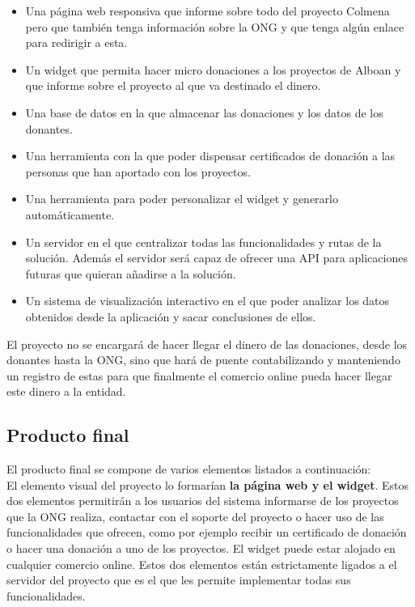 \begin{itemize}
	\item Una página web responsiva que informe sobre todo del proyecto Colmena pero que también tenga información sobre la ONG y que tenga algún enlace para redirigir a esta.
	\item Un widget que permita hacer micro donaciones a los proyectos de Alboan y que informe sobre el proyecto al que va destinado el dinero.
	\item Una base de datos en la que almacenar las donaciones y los datos de los donantes.
	\item Una herramienta con la que poder dispensar certificados de donación a las personas que han aportado con los proyectos.
	\item Una herramienta para poder personalizar el widget y generarlo automáticamente.
	\item Un servidor en el que centralizar todas las funcionalidades y rutas de la solución. Además el servidor será capaz de ofrecer una API para aplicaciones futuras que quieran añadirse a la solución.
	\item Un sistema de visualización interactivo en el que poder analizar los datos obtenidos desde la aplicación y sacar conclusiones de ellos.
\end{itemize}

El proyecto no se encargará de hacer llegar el dinero de las donaciones, desde los donantes hasta la ONG, sino que hará de puente contabilizando y manteniendo un registro de estas para que finalmente el comercio online pueda hacer llegar este dinero a la entidad.

\subsection{Producto final}
El producto final se compone de varios elementos listados a continuación:\\

El elemento visual del proyecto lo formarían \textbf{la página web y el widget}. Estos dos elementos permitirán a los usuarios del sistema informarse de los proyectos que la ONG realiza, contactar con el soporte del proyecto o hacer uso de las funcionalidades que ofrecen, como por ejemplo recibir un certificado de donación o hacer una donación a uno de los proyectos. El widget puede estar alojado en cualquier comercio online. Estos dos elementos están estrictamente ligados a el servidor del proyecto que es el que les permite implementar todas sus funcionalidades.\\

